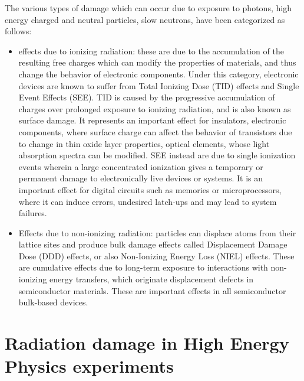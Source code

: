 \documentclass[twoside,a4paper]{article}
\begin{document}
The various types of damage which can occur due to exposure to photons, high energy charged and neutral particles, slow neutrons, have been categorized as follows:
\begin{itemize}
\item effects due to ionizing radiation: these are due to the accumulation of the resulting free charges which can modify the properties of materials, and thus change the behavior of electronic components.
Under this category, electronic devices are known to suffer from Total Ionizing Dose (TID) effects and Single Event Effects (SEE). TID is caused by the progressive accumulation of charges over prolonged exposure to ionizing radiation, and is also known as surface damage. It represents an important effect for insulators, electronic components, where surface charge can affect the behavior of transistors due to change in thin oxide layer properties, optical elements, whose light absorption spectra can be modified. SEE instead are due to single ionization events wherein a large concentrated ionization gives a temporary or permanent damage to electronically live devices or systems. It is an important effect for digital circuits such as memories or microprocessors, where it can induce errors, undesired latch$‐$ups and may lead to system failures.
\item Effects due to non-ionizing radiation: particles can displace atoms from their lattice sites and produce bulk damage effects called Displacement Damage Dose (DDD) effects, or also Non-Ionizing Energy Loss (NIEL) effects. These are cumulative effects due to long-term exposure to interactions with non$‐$ionizing energy transfers, which originate displacement defects in semiconductor materials. These are important effects in all semiconductor bulk$‐$based devices.
\end{itemize}


\section{Radiation damage in High Energy Physics experiments}
\end{document}
